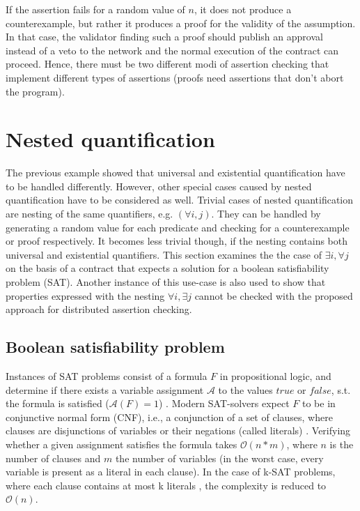 If the assertion fails for a random value of $n$, it does not produce a counterexample, but rather it produces a proof for the validity of the assumption. In that case, the validator finding such a proof should publish an approval instead of a veto to the network and the normal execution of the contract can proceed. Hence, there must be two different modi of assertion checking that implement different
types of assertions (proofs need assertions that don't abort the program).

\section{Nested quantification}
The previous example showed that universal and existential quantification have to be handled differently. However, other special cases caused by nested quantification have to be considered as well. Trivial cases of nested quantification are nesting of the same quantifiers, e.g. $(\forall i, j)$. They can be handled by generating a random value for each predicate and checking for a counterexample or proof respectively. It becomes less trivial though, if the nesting contains both universal and existential quantifiers. This section examines the the case of $\exists i, \forall j$ on the basis of a contract that expects a solution for a boolean satisfiability problem (SAT). Another instance of this use-case is also used to show that properties expressed with the nesting $\forall i, \exists j$ cannot be checked with the proposed approach for distributed assertion checking.

\subsection{Boolean satisfiability problem}\label{sec:sat}
Instances of SAT problems consist of a formula $F$ in propositional logic, and determine if there exists a variable assignment $\mathcal{A}$ to the values $true$ or $false$, s.t. the formula is satisfied ($\mathcal{A}(F) = 1$) \cite{Biere2009}. Modern SAT-solvers expect $F$ to be in conjunctive normal form (CNF), i.e., a conjunction of a set of clauses, where clauses are disjunctions of variables or their negations (called literals) \cite{cnf_math_encycl}. Verifying whether a given assignment satisfies the formula takes $\mathcal{O}(n*m)$, where $n$ is the number of clauses and $m$ the number of variables (in the worst case, every variable is present as a literal in each clause). In the case of k-SAT problems, where each clause contains at most k literals \cite{Biere2009}, the complexity is reduced to $\mathcal{O}(n)$.

